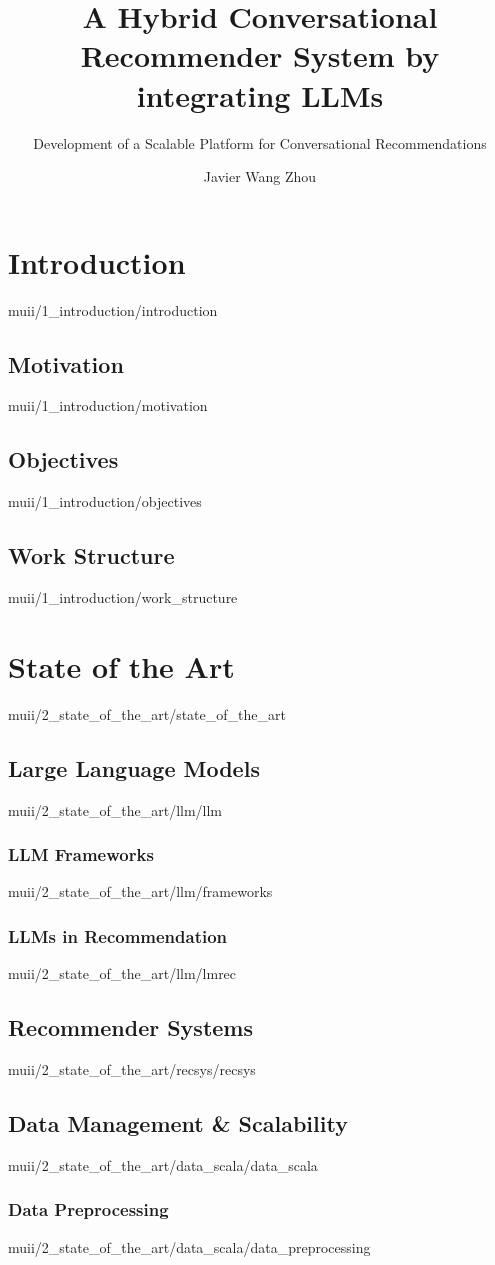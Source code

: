 \documentclass[english,epsbased,copyright,final,printable,covers,extendedindex,firstnumbered,tfm,gnuplot,loc,lof,lot]{tfgtfmthesisuam}
\title{A Hybrid Conversational Recommender System by integrating LLMs}
\subtitle{Development of a Scalable Platform for Conversational Recommendations}
\author{Javier Wang Zhou}
\begin{document}
  \chapter{Introduction\label{CAP:INTRODUCTION}}{muii/1_introduction/introduction}
    \section{Motivation\label{SEC:MOTIVATION}}{muii/1_introduction/motivation}
    \section{Objectives\label{SEC:GOALS}}{muii/1_introduction/objectives}
    \section{Work Structure\label{SEC:WORK_STRUCT}}{muii/1_introduction/work_structure}
  \chapter{State of the Art\label{CAP:STATE_OF_THE_ART}}{muii/2_state_of_the_art/state_of_the_art}
    \section{Large Language Models\label{SEC:LLM}}{muii/2_state_of_the_art/llm/llm}
      \subsection{LLM Frameworks\label{SS:LLMFRAMEWORKS}}{muii/2_state_of_the_art/llm/frameworks}
      \subsection{LLMs in Recommendation\label{SEC:LMREC}}{muii/2_state_of_the_art/llm/lmrec}

    \section{Recommender Systems\label{SEC:RECSYS}}{muii/2_state_of_the_art/recsys/recsys}

    \section{Data Management \& Scalability\label{SEC:DATA_SCALA}}{muii/2_state_of_the_art/data_scala/data_scala}
      \subsection{Data Preprocessing\label{SS:DATAPREPROC}}{muii/2_state_of_the_art/data_scala/data_preprocessing}
\end{document}
